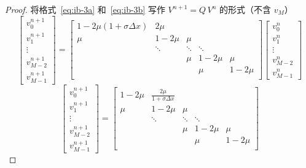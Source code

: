 \begin{proof}
    将格式~\eqref{eq:ib-3a} 和~\eqref{eq:ib-3b} 写作 $V^{n+1} = Q\, V^n$ 的形式（不含 $v_{M}$）
    \[
        \begin{bmatrix}
            v_0^{n+1} \\ v_1^{n+1} \\ \vdots \\ v_{M-2}^{n+1} \\ v_{M-1}^{n+1}
        \end{bmatrix}
        =
        \begin{bmatrix}
            1-2\mu(1+\sigma \Delta x) & 2\mu   &        &        &        \\
            \mu                       & 1-2\mu & \mu    &        &        \\
                                      & \ddots & \ddots & \ddots &        \\
                                      &        & \mu    & 1-2\mu & \mu    \\
                                      &        &        & \mu    & 1-2\mu \\
        \end{bmatrix}
        \begin{bmatrix}
            v_0^{n} \\ v_1^{n} \\ \vdots \\ v_{M-2}^{n} \\ v_{M-1}^{n}
        \end{bmatrix}
    \]
    \[
        \begin{bmatrix}
            v_0^{n+1} \\ v_1^{n+1} \\ \vdots \\ v_{M-2}^{n+1} \\ v_{M-1}^{n+1}
        \end{bmatrix}
        =
        \begin{bmatrix}
            1-2\mu & \frac{2\mu}{1+\sigma \Delta x} &        &        &        \\
            \mu    & 1-2\mu                         & \mu    &        &        \\
                   & \ddots                         & \ddots & \ddots &        \\
                   &                                & \mu    & 1-2\mu & \mu    \\
                   &                                &        & \mu    & 1-2\mu \\

\end{bmatrix}\]
\end{proof}
